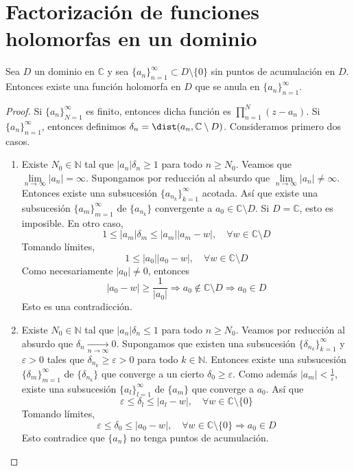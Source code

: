 \section{Factorización de funciones holomorfas en un dominio}
\begin{theorem}
    Sea $D$ un dominio en $\mathbb{C}$ y sea $\{a_n\}_{n=1}^\infty \subset D \setminus \{0\}$ sin puntos de acumulación en $D$.
    Entonces existe una función holomorfa en $D$ que se anula en $\{a_n\}_{n=1}^\infty$.
\end{theorem}

\begin{proof}
    Si $\{a_n\}_{N=1}^\infty$ es finito, entonces dicha función es $\prod_{n=1}^N (z-a_n)$.
    Si $\{a_n\}_{n=1}^\infty$, entonces definimos $\delta_n = \dist(a_n, \mathbb{C} \setminus D)$.
    Consideramos primero dos casos.
    \begin{enumerate}
        \item Existe $N_0 \in \mathbb{N}$ tal que $|a_n|\delta_n \geq 1$ para todo $n \geq N_0$.
              Veamos que $\lim\limits_{n \to \infty} |a_n| = \infty$.
              Supongamos por reducción al absurdo que $\lim\limits_{n \to \infty} |a_n| \neq \infty$.
              Entonces existe una subsucesión $\{a_{n_k}\}_{k=1}^\infty$ acotada.
              Así que existe una subsucesión $\{a_m\}_{m=1}^\infty$ de $\{a_{n_k}\}$ convergente a $a_0 \in \mathbb{C} \setminus D$.
              Si $D = \mathbb{C}$, esto es imposible.
              En otro caso,
              $$1 \leq |a_m|\delta_m \leq |a_m||a_m-w|, \quad \forall w \in \mathbb{C} \setminus D$$
              Tomando límites,
              $$1 \leq |a_0||a_0-w|, \quad \forall w \in \mathbb{C} \setminus D$$
              Como necesariamente $|a_0| \neq 0$, entonces
              $$|a_0-w| \geq \frac{1}{|a_0|} \Rightarrow a_0 \notin \mathbb{C} \setminus D \Rightarrow a_0 \in D$$
              Esto es una contradicción.

        \item Existe $N_0 \in \mathbb{N}$ tal que $|a_n|\delta_n \leq 1$ para todo $n \geq N_0$.
              Veamos por reducción al absurdo que $\delta_n \xrightarrow[n \to \infty]{} 0$.
              Supongamos que existen una subsucesión $\{\delta_{n_k}\}_{k=1}^\infty$ y $\varepsilon > 0$ tales que $\delta_{n_k} \geq \varepsilon > 0$ para todo $k \in \mathbb{N}$.
              Entonces existe una subsucesión $\{\delta_m\}_{m=1}^\infty$ de $\{\delta_{n_k}\}$ que converge a un cierto $\delta_0 \geq \varepsilon$.
              Como además $|a_m| < \frac{1}{\varepsilon}$, existe una subsucesión $\{a_l\}_{l=1}^\infty$ de $\{a_m\}$ que converge a $a_0$.
              Así que
              $$\varepsilon \leq \delta_l \leq |a_l-w|, \quad \forall w \in \mathbb{C} \setminus \{0\}$$
              Tomando límites,
              $$\varepsilon \leq \delta_0 \leq |a_0-w|, \quad \forall w \in \mathbb{C} \setminus \{0\} \Rightarrow a_0 \in D$$
              Esto contradice que $\{a_n\}$ no tenga puntos de acumulación.


\end{enumerate}
\end{proof}
